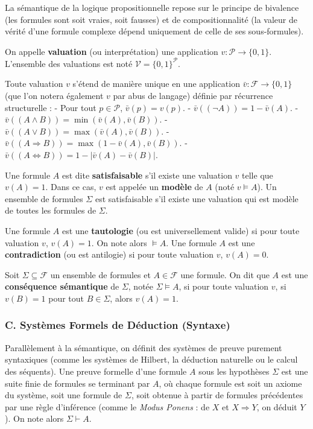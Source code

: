\documentclass[11pt,a4paper]{article}
\begin{document}
La sémantique de la logique propositionnelle repose sur le principe de
bivalence (les formules sont soit vraies, soit fausses) et de
compositionnalité (la valeur de vérité d'une formule complexe dépend
uniquement de celle de ses sous-formules).

On appelle \textbf{valuation} (ou interprétation) une application
\(v : \mathcal{P} \to \{0, 1\}\). L'ensemble des valuations est noté
\(\mathcal{V} = \{0, 1\}^\mathcal{P}\).

Toute valuation \(v\) s'étend de manière unique en une application
\(\bar{v} : \mathcal{F} \to \{0, 1\}\) (que l'on notera également \(v\)
par abus de langage) définie par récurrence structurelle : - Pour tout
\(p \in \mathcal{P}\), \(\bar{v}(p) = v(p)\). -
\(\bar{v}((\neg A)) = 1 - \bar{v}(A)\). -
\(\bar{v}((A \land B)) = \min(\bar{v}(A), \bar{v}(B))\). -
\(\bar{v}((A \lor B)) = \max(\bar{v}(A), \bar{v}(B))\). -
\(\bar{v}((A \Rightarrow B)) = \max(1 - \bar{v}(A), \bar{v}(B))\). -
\(\bar{v}((A \Leftrightarrow B)) = 1 - |\bar{v}(A) - \bar{v}(B)|\).

Une formule \(A\) est dite \textbf{satisfaisable} s'il existe une
valuation \(v\) telle que \(v(A) = 1\). Dans ce cas, \(v\) est appelée
un \textbf{modèle} de \(A\) (noté \(v \models A\)). Un ensemble de
formules \(\Sigma\) est satisfaisable s'il existe une valuation qui est
modèle de toutes les formules de \(\Sigma\).

Une formule \(A\) est une \textbf{tautologie} (ou est universellement
valide) si pour toute valuation \(v\), \(v(A) = 1\). On note alors
\(\models A\). Une formule \(A\) est une \textbf{contradiction} (ou est
antilogie) si pour toute valuation \(v\), \(v(A) = 0\).

Soit \(\Sigma \subseteq \mathcal{F}\) un ensemble de formules et
\(A \in \mathcal{F}\) une formule. On dit que \(A\) est une
\textbf{conséquence sémantique} de \(\Sigma\), notée
\(\Sigma \models A\), si pour toute valuation \(v\), si \(v(B) = 1\)
pour tout \(B \in \Sigma\), alors \(v(A) = 1\).

\hypertarget{c.-systuxe8mes-formels-de-duxe9duction-syntaxe}{%
\subsubsection{C. Systèmes Formels de Déduction
(Syntaxe)}\label{c.-systuxe8mes-formels-de-duxe9duction-syntaxe}}

Parallèlement à la sémantique, on définit des systèmes de preuve
purement syntaxiques (comme les systèmes de Hilbert, la déduction
naturelle ou le calcul des séquents). Une preuve formelle d'une formule
\(A\) sous les hypothèses \(\Sigma\) est une suite finie de formules se
terminant par \(A\), où chaque formule est soit un axiome du système,
soit une formule de \(\Sigma\), soit obtenue à partir de formules
précédentes par une règle d'inférence (comme le \emph{Modus Ponens} : de
\(X\) et \(X \Rightarrow Y\), on déduit \(Y\)). On note alors
\(\Sigma \vdash A\).
\end{document}
